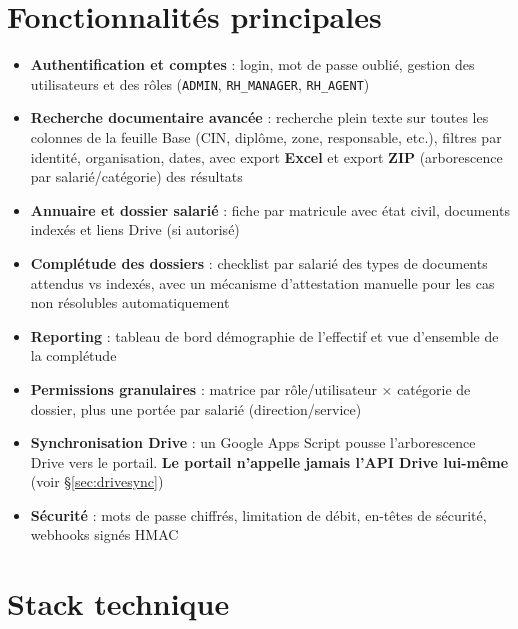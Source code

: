 \documentclass[10.5pt,a4paper]{article}
\newcommand{\mono}[1]{{\ttfamily\nolinkurl{#1}}}
\begin{document}
\section{Fonctionnalités principales}

\begin{itemize}[leftmargin=1.4em, itemsep=0.3em, topsep=0.3em]
  \item \textbf{Authentification et comptes} : login, mot de passe oublié, gestion des utilisateurs et des rôles (\mono{ADMIN}, \mono{RH\_MANAGER}, \mono{RH\_AGENT})
  \item \textbf{Recherche documentaire avancée} : recherche plein texte sur toutes les colonnes de la feuille Base (CIN, diplôme, zone, responsable, etc.), filtres par identité, organisation, dates, avec export \textbf{Excel} et export \textbf{ZIP} (arborescence par salarié/catégorie) des résultats
  \item \textbf{Annuaire et dossier salarié} : fiche par matricule avec état civil, documents indexés et liens Drive (si autorisé)
  \item \textbf{Complétude des dossiers} : checklist par salarié des types de documents attendus vs indexés, avec un mécanisme d'attestation manuelle pour les cas non résolubles automatiquement
  \item \textbf{Reporting} : tableau de bord démographie de l'effectif et vue d'ensemble de la complétude
  \item \textbf{Permissions granulaires} : matrice par rôle/utilisateur × catégorie de dossier, plus une portée par salarié (direction/service)
  \item \textbf{Synchronisation Drive} : un Google Apps Script pousse l'arborescence Drive vers le portail. \textbf{Le portail n'appelle jamais l'API Drive lui-même} (voir §\ref{sec:drivesync})
  \item \textbf{Sécurité} : mots de passe chiffrés, limitation de débit, en-têtes de sécurité, webhooks signés HMAC
\end{itemize}

\section{Stack technique}
\end{document}
